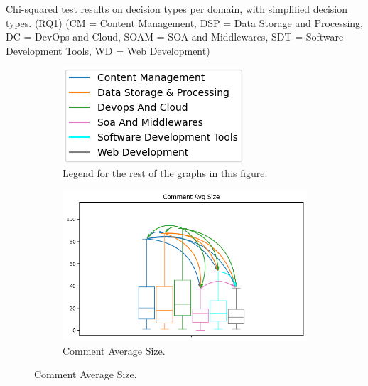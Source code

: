 \documentclass[10pt,a4paper,twocolumn]{article}
\begin{document}
\begin{table}[]
    \centering

    \caption{Chi-squared test results on decision types per domain, with simplified decision types. (RQ1) (CM = Content Management, DSP = Data Storage and Processing, DC = DevOps and Cloud, SOAM = SOA and Middlewares, SDT = Software Development Tools, WD = Web Development)}
    \label{table:rq1_simplified}
\end{table}



\begin{figure}
    \centering
    \begin{subfigure}{.35\textwidth}
      \centering
      \includegraphics[width=\linewidth]{rq2_mw/domlegend.png}
      \caption{Legend for the rest of the graphs in this figure.}
    \end{subfigure}
    \begin{subfigure}{.4\textwidth}
      \centering
      \includegraphics[width=\linewidth]{rq2_mw/comment avg size_high_conf_plot_arrows.png}
      \caption{Comment Average Size.}
    \end{subfigure}
    

\end{figure}
\end{document}
